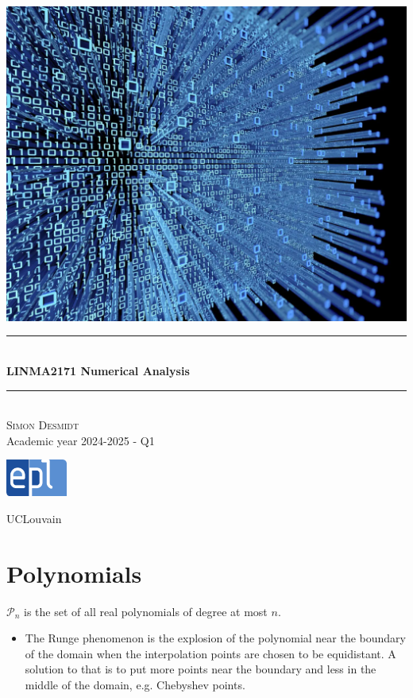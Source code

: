 \documentclass[12pt, openany]{report}
\theoremstyle{definition}
\newcommand{\HRule}{\rule{\linewidth}{0.5mm}}
\begin{document}
\begin{titlepage}
    \begin{sffamily}
    \begin{center}
        \includegraphics[scale=0.25]{img/page_de_garde.png} \\[1cm]
        \HRule \\[0.4cm]
        { \huge \bfseries LINMA2171 Numerical Analysis \\[0.4cm] }
    
        \HRule \\[1.5cm]
        \textsc{\LARGE Simon Desmidt}\\[1cm]
        \vfill
        \vspace{2cm}
        {\large Academic year 2024-2025 - Q1}
        \vspace{0.4cm}
         
        \includegraphics[width=0.15\textwidth]{img/epl.png}
        
        UCLouvain\\
    
    \end{center}
    \end{sffamily}
\end{titlepage}

\setcounter{tocdepth}{1}
\tableofcontents
\chapter{Polynomials}
\(\mathcal{P}_n\) is the set of all real polynomials of degree at most \(n\). 
\begin{itemize}
    \item The Runge phenomenon is the explosion of the polynomial near the boundary of the domain when the interpolation points are chosen to be equidistant. A solution to that is to put more points near the boundary and less in the middle of the domain, e.g. Chebyshev points.
\end{itemize}
\end{document}
